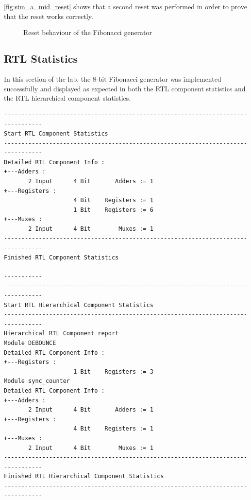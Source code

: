 \documentclass[10pt]{article}
\begin{document}
 \autoref{fig:sim_a_mid_reset} shows that a second reset was performed in order to prove that the reset works correctly.
\begin{figure}[ht]
    \centering
    \caption{Reset behaviour of the Fibonacci generator}
    \label{fig:sim_a_mid_reset}
\end{figure}
\newpage



\subsection{RTL Statistics}
In this section of the lab, the 8-bit Fibonacci generator was implemented successfully and displayed as expected in both
the RTL component statistics and the RTL hierarchical component statistics.
\begin{verbatim}
---------------------------------------------------------------------------------
Start RTL Component Statistics 
---------------------------------------------------------------------------------
Detailed RTL Component Info : 
+---Adders : 
	   2 Input      4 Bit       Adders := 1     
+---Registers : 
	                4 Bit    Registers := 1     
	                1 Bit    Registers := 6     
+---Muxes : 
	   2 Input      4 Bit        Muxes := 1     
---------------------------------------------------------------------------------
Finished RTL Component Statistics 
---------------------------------------------------------------------------------
---------------------------------------------------------------------------------
Start RTL Hierarchical Component Statistics 
---------------------------------------------------------------------------------
Hierarchical RTL Component report 
Module DEBOUNCE 
Detailed RTL Component Info : 
+---Registers : 
	                1 Bit    Registers := 3     
Module sync_counter 
Detailed RTL Component Info : 
+---Adders : 
	   2 Input      4 Bit       Adders := 1     
+---Registers : 
	                4 Bit    Registers := 1     
+---Muxes : 
	   2 Input      4 Bit        Muxes := 1     
---------------------------------------------------------------------------------
Finished RTL Hierarchical Component Statistics
---------------------------------------------------------------------------------
\end{verbatim}
\newpage
\end{document}
